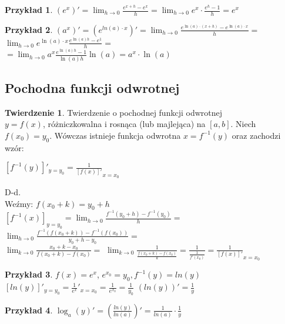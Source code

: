 \documentclass{article}
\theoremstyle{definition}
\theoremstyle{definition}
\newtheorem{tw}{Twierdzenie}[subsection]
\theoremstyle{definition}
\newtheorem{pk}{Przykład}[subsection]
\theoremstyle{definition}
\begin{document}
\begin{pk}
    $(e^x)'=\lim_{h\rightarrow 0} \frac{e^{x+h}-e^x}{h} = \lim_{h\rightarrow 0} e^x\cdot \frac{e^h-1}{h} = e^x$   
\end{pk}

\begin{pk}
    $(a^x)'=(e^{ln(a)\cdot x})'=\lim_{h\rightarrow 0} \frac{e^{\ln(a)\cdot(x+h)}-e^{\ln(a)\cdot x}}{h}=$
    $\lim_{h\rightarrow 0} e^{\ln(a)\cdot x} \frac{e^{\ln(a) h}- e^{1}}{h}=$\\
    $=\lim_{h\rightarrow 0} a^x \frac{e^{\ln(a)h}-1}{\ln(a) h} \ln(a) = a^x \cdot \ln(a)$
\end{pk}

\subsection{Pochodna funkcji odwrotnej}

\begin{tw}
    Twierdzenie o pochodnej funkcji odwrotnej\\
    $y=f(x)$, różniczkowalna i rosnąca (lub majlejąca) na $[a,b]$.
    Niech $f(x_0)=y_0$. Wówczas istnieje funkcja odwrotna $x=f^{-1}(y)$
    oraz zachodzi wzór:
    \begin{center}
        $\left[f^{-1}(y)\right]'_{y=y_0} = \frac{1}{\left[f(x)\right]'}_{x=x_0}$
    \end{center}
\end{tw}
D-d.\\
Weźmy: $f(x_0 + k) = y_0 + h$\\
$\left[f^{-1}(x)\right]_{y=y_0}=\lim_{h\rightarrow 0} \frac{f^{-1}(y_0+h) - f^{-1}(y_0)}{h}=$
$\lim_{h\rightarrow 0} \frac{f^{-1}(f(x_0+k))-f^{-1}(f(x_0))}{y_0+h-y_0}=$\\
$\lim_{k\rightarrow 0} \frac{x_0 + k - x_0}{f(x_0 +k)-f(x_0)}=$
$\lim_{k\rightarrow 0} \frac{1}{\frac{f(x_0+k)-f(x_0)}{k}}=\frac{1}{\frac{1}{f'(x_0)}}=\frac{1}{\left[f(x)\right]'}_{x=x_0}$

\begin{pk}
    $f(x)=e^x$, $e^{x_0}=y_0, f^{-1}(y)=ln(y)$\\
    $\left[ln(y)\right]'_{y=y_0}=\frac{1}{e^x}'_{x=x_0} = \frac{1}{e^{x_0}} = \frac{1}{y_0}$
    $\left(ln(y)\right)' = \frac{1}{y}$
\end{pk}

\begin{pk}
    $\log_a(y)'=\left(\frac{ln(y)}{ln(a)}\right)'=\frac{1}{ln(a)} \cdot \frac{1}{y}$
\end{pk}
\end{document}
